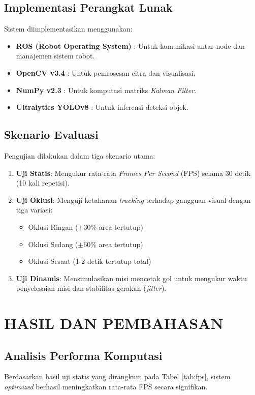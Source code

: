 \documentclass[12pt,a4paper]{article}
\begin{document}
\subsection{Implementasi Perangkat Lunak}
Sistem diimplementasikan menggunakan:
\begin{itemize}
    \item \textbf{ROS (Robot Operating System)} \cite{Quigley2009}: Untuk komunikasi antar-node dan manajemen sistem robot.
    \item \textbf{OpenCV v3.4} \cite{OpenCV2025}: Untuk pemrosesan citra dan visualisasi.
    \item \textbf{NumPy v2.3} \cite{NumPy2025}: Untuk komputasi matriks \textit{Kalman Filter}.
    \item \textbf{Ultralytics YOLOv8} \cite{Ultralytics2025}: Untuk inferensi deteksi objek.
\end{itemize}

\subsection{Skenario Evaluasi}
Pengujian dilakukan dalam tiga skenario utama:
\begin{enumerate}
    \item \textbf{Uji Statis}: Mengukur rata-rata \textit{Frames Per Second} (FPS) selama 30 detik (10 kali repetisi).
    \item \textbf{Uji Oklusi}: Menguji ketahanan \textit{tracking} terhadap gangguan visual dengan tiga variasi:
    \begin{itemize}
        \item Oklusi Ringan ($\pm$30\% area tertutup)
        \item Oklusi Sedang ($\pm$60\% area tertutup)
        \item Oklusi Sesaat (1-2 detik tertutup total)
    \end{itemize}
    \item \textbf{Uji Dinamis}: Mensimulasikan misi mencetak gol untuk mengukur waktu penyelesaian misi dan stabilitas gerakan (\textit{jitter}).
\end{enumerate}

\section{HASIL DAN PEMBAHASAN}

\subsection{Analisis Performa Komputasi}
Berdasarkan hasil uji statis yang dirangkum pada Tabel \ref{tab:fps}, sistem \textit{optimized} berhasil meningkatkan rata-rata FPS secara signifikan.
\end{document}
